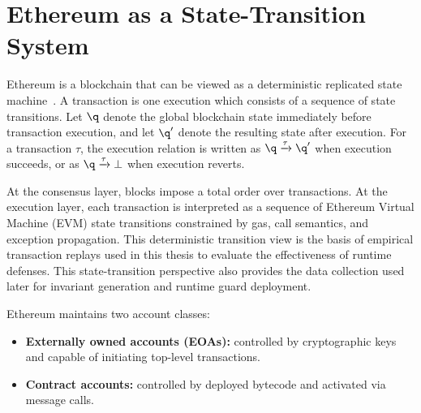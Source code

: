 


\section{Ethereum as a State-Transition System}
Ethereum is a blockchain that can be viewed as a deterministic replicated 
state machine~\cite{ethereum22,buterin2014ethereum}. 
A transaction is 
one execution which consists of a sequence of state transitions.
Let $\q$ denote the global blockchain state 
immediately before transaction execution, 
and let $\q'$ denote the resulting state after 
execution. For a transaction $\tau$, the execution 
relation is written as $\q \xrightarrow{\tau} \q'$ when 
execution succeeds, or as $\q \xrightarrow{\tau} \bot$ when 
execution reverts.

At the consensus layer, blocks impose a total order over 
transactions. At the execution layer, each transaction 
is interpreted as a sequence of Ethereum Virtual Machine (EVM)
state transitions 
constrained by gas, call semantics, and exception propagation. 
This deterministic transition view is the basis 
of empirical transaction replays used in this thesis to 
evaluate the effectiveness of runtime defenses. 
This state-transition perspective also provides 
the data collection used later for invariant generation 
 and runtime guard deployment.

Ethereum maintains two account classes:
\begin{itemize}
    \item \textbf{Externally owned accounts (EOAs):} 
    controlled by cryptographic keys and capable of 
    initiating top-level transactions.
    \item \textbf{Contract accounts:} controlled 
    by deployed bytecode and activated via message calls.
\end{itemize}


